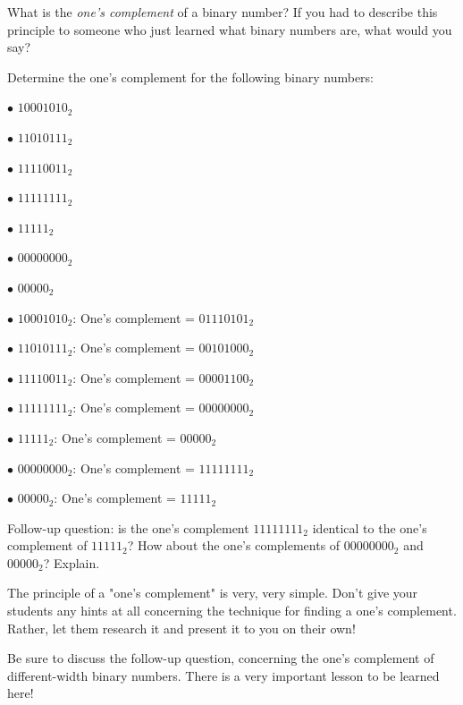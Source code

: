 

What is the {\it one's complement} of a binary number?  If you had to describe this principle to someone who just learned what binary numbers are, what would you say?

Determine the one's complement for the following binary numbers:

\medskip
\item{$\bullet$} $10001010_2$
\item{$\bullet$} $11010111_2$
\item{$\bullet$} $11110011_2$
\item{$\bullet$} $11111111_2$
\item{$\bullet$} $11111_2$
\item{$\bullet$} $00000000_2$
\item{$\bullet$} $00000_2$
\medskip







\medskip
\item{$\bullet$} $10001010_2$: One's complement = $01110101_2$
\item{$\bullet$} $11010111_2$: One's complement = $00101000_2$
\item{$\bullet$} $11110011_2$: One's complement = $00001100_2$
\item{$\bullet$} $11111111_2$: One's complement = $00000000_2$
\item{$\bullet$} $11111_2$: One's complement = $00000_2$
\item{$\bullet$} $00000000_2$: One's complement = $11111111_2$
\item{$\bullet$} $00000_2$: One's complement = $11111_2$
\medskip

\vskip 10pt

Follow-up question: is the one's complement $11111111_2$ identical to the one's complement of $11111_2$?  How about the one's complements of $00000000_2$ and $00000_2$?  Explain.







The principle of a "one's complement" is very, very simple.  Don't give your students any hints at all concerning the technique for finding a one's complement.  Rather, let them research it and present it to you on their own!

Be sure to discuss the follow-up question, concerning the one's complement of different-width binary numbers.  There is a very important lesson to be learned here!




